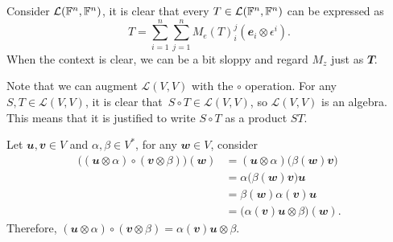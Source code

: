 \documentclass[math]{amznotes}
\theoremstyle{remark}
\begin{document}
Consider $\mathcal{L}(\mathbb{F}^n, \mathbb{F}^n)$, it is clear that every $T \in \mathcal{L}(\mathbb{F}^n, \mathbb{F}^n)$ can be expressed as
\begin{equation*}
    T = \sum_{i = 1}^{n}\sum_{j = 1}^{n}M_e(T)_i^j\left(\mathbfit{e}_i \otimes \epsilon^i\right).
\end{equation*}
When the context is clear, we can be a bit sloppy and regard $M_z$ just as $\mathbfit{T}$.

Note that we can augment $\mathcal{L}(V, V)$ with the $\circ$ operation. For any $S, T \in \mathcal{L}(V, V)$, it is clear that~$S \circ T \in \mathcal{L}(V, V)$, so $\mathcal{L}(V, V)$ is an algebra. This means that it is justified to write $S \circ T$ as a product $ST$.

Let $\mathbfit{u}, \mathbfit{v} \in V$ and $\alpha, \beta \in V^*$, for any $\mathbfit{w} \in V$, consider
\begin{align*}
    \bigl((\mathbfit{u} \otimes \alpha) \circ (\mathbfit{v} \otimes \beta)\bigr)(\mathbfit{w}) & = (\mathbfit{u} \otimes \alpha)\bigl(\beta(\mathbfit{w})\mathbfit{v}\bigr) \\
    & = \alpha\bigl(\beta(\mathbfit{w})\mathbfit{v}\bigr)\mathbfit{u} \\
    & = \beta(\mathbfit{w})\alpha(\mathbfit{v})\mathbfit{u} \\
    & = \bigl(\alpha(\mathbfit{v})\mathbfit{u} \otimes \beta\bigr)(\mathbfit{w}).
\end{align*}
Therefore, $(\mathbfit{u} \otimes \alpha) \circ (\mathbfit{v} \otimes \beta) = \alpha(\mathbfit{v})\mathbfit{u} \otimes \beta$.
\end{document}
